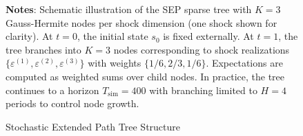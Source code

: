 \begin{figure}[h]
\caption{Stochastic Extended Path Tree Structure}
\label{fig:sep_tree}
\begin{flushleft}
\footnotesize
\textbf{Notes}: Schematic illustration of the SEP sparse tree with $K=3$ Gauss-Hermite nodes per shock dimension (one shock shown for clarity). At $t=0$, the initial state $s_0$ is fixed externally. At $t=1$, the tree branches into $K=3$ nodes corresponding to shock realizations $\{\varepsilon^{(1)}, \varepsilon^{(2)}, \varepsilon^{(3)}\}$ with weights $\{1/6, 2/3, 1/6\}$. Expectations are computed as weighted sums over child nodes. In practice, the tree continues to a horizon $T_{\text{sim}}=400$ with branching limited to $H=4$ periods to control node growth.
\end{flushleft}
\end{figure}

\clearpage

